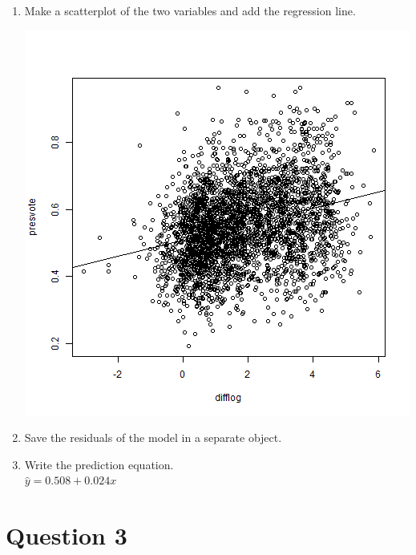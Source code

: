 \documentclass[12pt,letterpaper]{article}
\begin{document}
\begin{enumerate}
\begin{table}[!htbp]
		\end{table}  \vspace{5cm}
		\item Make a scatterplot of the two variables and add the regression line. 	
		
		\includegraphics[scale=.80]{presvote ~ difflog.png} 	
		\vspace{5cm}
		\item Save the residuals of the model in a separate object.
			\vspace{5cm}
		\item Write the prediction equation.\\
		$  \hat{y} = 0.508 + 0.024x $
	\end{enumerate}
	
	\newpage	
\section*{Question 3}
\end{document}
